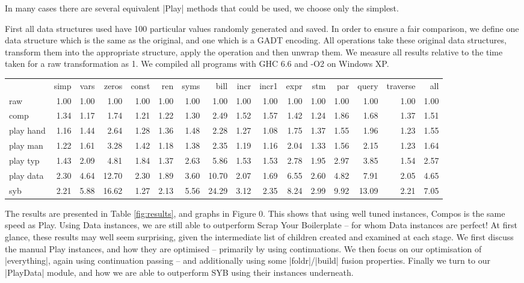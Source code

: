 \documentclass[preprint]{sigplanconf}
\begin{document}
In many cases there are several equivalent |Play| methods that could be used, we choose only the simplest.

First all data structures used have 100 particular values randomly generated and saved. In order to ensure a fair comparison, we define one data structure which is the same as the original, and one which is a GADT encoding. All operations take these original data structures, transform them into the appropriate structure, apply the operation and then unwrap them. We measure all results relative to the time taken for a raw transformation as 1. We compiled all programs with GHC 6.6 and -O2 on Windows XP.

\begin{figure*}
\caption{Table of results.}
\label{fig:results}
\begin{tabular*}{\textwidth}{l||rrrrrrrrr||rrr||rr||r}
 & 	simp & 	vars & 	zeros & 	const & 	ren & 	syms & 	bill & 	incr & 	incr1 & 	expr & 	 stm & 	par & 	query & 	traverse & 	all \\
raw & 	1.00 & 	1.00 & 	1.00 & 	1.00 & 	1.00 & 	1.00 & 	1.00 & 	1.00 & 	1.00 & 	1.00 & 	1.00 & 	 1.00 & 	1.00 & 	1.00 & 	1.00 \\
comp & 	1.34 & 	1.17 & 	1.74 & 	1.21 & 	1.22 & 	1.30 & 	2.49 & 	1.52 & 	1.57 & 	1.42 & 	1.24 & 	 1.86 & 	1.68 & 	1.37 & 	1.51 \\
play hand & 	1.16 & 	1.44 & 	2.64 & 	1.28 & 	1.36 & 	1.48 & 	2.28 & 	1.27 & 	1.08 & 	1.75 & 	 1.37 & 	1.55 & 	1.96 & 	1.23 & 	1.55 \\
play man & 	1.22 & 	1.61 & 	3.28 & 	1.42 & 	1.18 & 	1.38 & 	2.35 & 	1.19 & 	1.16 & 	2.04 & 	1.33 & 	 1.56 & 	2.15 & 	1.23 & 	1.64 \\
play typ & 	1.43 & 	2.09 & 	4.81 & 	1.84 & 	1.37 & 	2.63 & 	5.86 & 	1.53 & 	1.53 & 	2.78 & 	1.95 & 	 2.97 & 	3.85 & 	1.54 & 	2.57 \\
play data & 	2.30 & 	4.64 & 	12.70 & 	2.30 & 	1.89 & 	3.60 & 	10.70 & 	2.07 & 	1.69 & 	 6.55 & 	2.60 & 	4.82 & 	7.91 & 	2.05 & 	4.65 \\
syb & 	2.21 & 	5.88 & 	16.62 & 	1.27 & 	2.13 & 	5.56 & 	24.29 & 	3.12 & 	2.35 & 	8.24 & 	 2.99 & 	9.92 & 	13.09 & 	2.21 & 	7.05 \\
\end{tabular*}
\end{figure*}


The results are presented in Table \ref{fig:results}, and graphs in Figure 0. This shows that using well tuned instances, Compos is the same speed as Play. Using Data instances, we are still able to outperform Scrap Your Boilerplate -- for whom Data instances are perfect! At first glance, these results may well seem surprising, given the intermediate list of children created and examined at each stage. We first discuss the manual Play instances, and how they are optimised -- primarily by using continuations. We then focus on our optimisation of |everything|, again using continuation passing -- and additionally using some |foldr|/|build| fusion properties. Finally we turn to our |PlayData| module, and how we are able to outperform SYB using their instances underneath.
\end{document}
